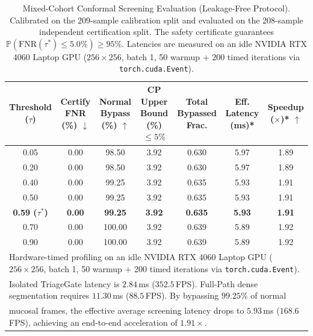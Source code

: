 \documentclass[journal]{IEEEtran}
\begin{document}
\begin{table}[t]
\centering
\caption{Mixed-Cohort Conformal Screening Evaluation (Leakage-Free Protocol). Calibrated on the 209-sample calibration split and evaluated on the 208-sample independent certification split. The safety certificate guarantees $\mathbb{P}(\mathrm{FNR}(\tau^*) \le 5.0\%) \ge 95\%$. Latencies are measured on an idle NVIDIA RTX 4060 Laptop GPU ($256\times 256$, batch 1, 50 warmup + 200 timed iterations via \texttt{torch.cuda.Event}).}
\label{tab:screening}
\begin{tabular}{ccccccc}
\toprule
Threshold ($\tau$) & Certify FNR (\%) $\downarrow$ & Normal Bypass (\%) $\uparrow$ & CP Upper Bound (\%) $\le 5\%$ & Total Bypassed Frac. & Eff. Latency (ms)* & Speedup ($\times$)* $\uparrow$ \\
\midrule
0.05 & 0.00 & 98.50 & 3.92 & 0.630 & 5.97 & 1.89 \\
0.20 & 0.00 & 98.50 & 3.92 & 0.630 & 5.97 & 1.89 \\
0.40 & 0.00 & 99.25 & 3.92 & 0.635 & 5.93 & 1.91 \\
0.50 & 0.00 & 99.25 & 3.92 & 0.635 & 5.93 & 1.91 \\
\midrule
\textbf{0.59 ($\tau^*$)} & \textbf{0.00} & \textbf{99.25} & \textbf{3.92} & \textbf{0.635} & \textbf{5.93} & \textbf{1.91} \\
\midrule
0.70 & 0.00 & 100.00 & 3.92 & 0.639 & 5.89 & 1.92 \\
0.90 & 0.00 & 100.00 & 3.92 & 0.639 & 5.89 & 1.92 \\
\bottomrule
\multicolumn{7}{l}{\footnotesize *Hardware-timed profiling on an idle NVIDIA RTX 4060 Laptop GPU ($256\times 256$, batch 1, 50 warmup + 200 timed iterations via \texttt{torch.cuda.Event}).} \\
\multicolumn{7}{l}{\footnotesize Isolated TriageGate latency is $2.84$\,ms ($352.5$\,FPS). Full-Path dense segmentation requires $11.30$\,ms ($88.5$\,FPS). By bypassing $99.25\%$ of normal} \\
\multicolumn{7}{l}{\footnotesize mucosal frames, the effective average screening latency drops to $5.93$\,ms ($168.6$\,FPS), achieving an end-to-end acceleration of $1.91\times$.}
\end{tabular}
\end{table}
\end{document}
